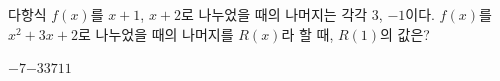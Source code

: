 다항식 $f(x)$를 $x+1$, $x+2$로 나누었을 때의 나머지는 각각 $3$, $-1$이다. $f(x)$를 $x^2+3x+2$로 나누었을 때의 나머지를 $R(x)$라 할 때, $R(1)$의 값은?
\begin{choices32}{$-7$}{$-3$}{$3$}{$7$}{$11$}\end{choices32}
